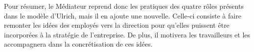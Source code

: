 Pour résumer, le \og{}Médiateur\fg{} reprend donc les pratiques des quatre rôles présents dans le modèle d'Ulrich, mais il en ajoute une nouvelle. Celle-ci consiste à faire remonter les idées des employés vers la direction pour qu'elles puissent être incorporées à la stratégie de l'entreprise. De plus, il motivera les travailleurs et les accompagnera dans la concrétisation de ces idées. 